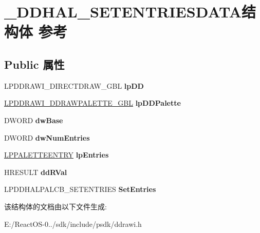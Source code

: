 \hypertarget{struct___d_d_h_a_l___s_e_t_e_n_t_r_i_e_s_d_a_t_a}{}\section{\+\_\+\+D\+D\+H\+A\+L\+\_\+\+S\+E\+T\+E\+N\+T\+R\+I\+E\+S\+D\+A\+T\+A结构体 参考}
\label{struct___d_d_h_a_l___s_e_t_e_n_t_r_i_e_s_d_a_t_a}
\subsection*{Public 属性}
\begin{DoxyCompactItemize}
\item 
\mbox{\label{struct___d_d_h_a_l___s_e_t_e_n_t_r_i_e_s_d_a_t_a_a176b4875e9d3f251462dd6bb12feebb7}} 
L\+P\+D\+D\+R\+A\+W\+I\+\_\+\+D\+I\+R\+E\+C\+T\+D\+R\+A\+W\+\_\+\+G\+BL {\bfseries lp\+DD}
\item 
\mbox{\label{struct___d_d_h_a_l___s_e_t_e_n_t_r_i_e_s_d_a_t_a_aae7d82ea6457c8465be3925496268337}} 
\hyperlink{struct___d_d_r_a_w_i___d_d_r_a_w_p_a_l_e_t_t_e___g_b_l}{L\+P\+D\+D\+R\+A\+W\+I\+\_\+\+D\+D\+R\+A\+W\+P\+A\+L\+E\+T\+T\+E\+\_\+\+G\+BL} {\bfseries lp\+D\+D\+Palette}
\item 
\mbox{\label{struct___d_d_h_a_l___s_e_t_e_n_t_r_i_e_s_d_a_t_a_a2d9ddec1d901622b2254160a180def33}} 
D\+W\+O\+RD {\bfseries dw\+Base}
\item 
\mbox{\label{struct___d_d_h_a_l___s_e_t_e_n_t_r_i_e_s_d_a_t_a_a98c80b0e2886f026ea73db4a5145d157}} 
D\+W\+O\+RD {\bfseries dw\+Num\+Entries}
\item 
\mbox{\label{struct___d_d_h_a_l___s_e_t_e_n_t_r_i_e_s_d_a_t_a_afb8c94de33977630d451422a9cdd2c5c}} 
\hyperlink{structtag_p_a_l_e_t_t_e_e_n_t_r_y}{L\+P\+P\+A\+L\+E\+T\+T\+E\+E\+N\+T\+RY} {\bfseries lp\+Entries}
\item 
\mbox{\label{struct___d_d_h_a_l___s_e_t_e_n_t_r_i_e_s_d_a_t_a_a0a237e78a52f7d18522a73cd3be15f19}} 
H\+R\+E\+S\+U\+LT {\bfseries dd\+R\+Val}
\item 
\mbox{\label{struct___d_d_h_a_l___s_e_t_e_n_t_r_i_e_s_d_a_t_a_a926d95c519974eb0d3e854a7ecbd5fd1}} 
L\+P\+D\+D\+H\+A\+L\+P\+A\+L\+C\+B\+\_\+\+S\+E\+T\+E\+N\+T\+R\+I\+ES {\bfseries Set\+Entries}
\end{DoxyCompactItemize}


该结构体的文档由以下文件生成\+:\begin{DoxyCompactItemize}
\item 
E\+:/\+React\+O\+S-\/0../sdk/include/psdk/ddrawi.\+h\end{DoxyCompactItemize}
